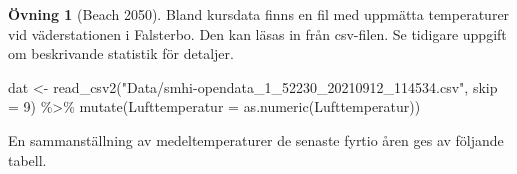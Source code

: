 \documentclass[
]{book}
\newenvironment{Shaded}{\begin{snugshade}}{\end{snugshade}}
\newcommand{\AttributeTok}[1]{\textcolor[rgb]{0.77,0.63,0.00}{#1}}
\newcommand{\DecValTok}[1]{\textcolor[rgb]{0.00,0.00,0.81}{#1}}
\newcommand{\FunctionTok}[1]{\textcolor[rgb]{0.00,0.00,0.00}{#1}}
\newcommand{\NormalTok}[1]{#1}
\newcommand{\OtherTok}[1]{\textcolor[rgb]{0.56,0.35,0.01}{#1}}
\newcommand{\SpecialCharTok}[1]{\textcolor[rgb]{0.00,0.00,0.00}{#1}}
\newcommand{\StringTok}[1]{\textcolor[rgb]{0.31,0.60,0.02}{#1}}
\theoremstyle{definition}
\theoremstyle{definition}
\theoremstyle{definition}
\newtheorem{exercise}{Övning}[chapter]
\theoremstyle{definition}
\theoremstyle{remark}
\begin{document}
\begin{exercise}[Beach 2050]
Bland kursdata finns en fil med uppmätta temperaturer vid väderstationen i Falsterbo. Den kan läsas in från csv-filen. Se tidigare uppgift om beskrivande statistik för detaljer.

\begin{Shaded}
\begin{Highlighting}[]
\NormalTok{dat }\OtherTok{\textless{}{-}} \FunctionTok{read\_csv2}\NormalTok{(}\StringTok{"Data/smhi{-}opendata\_1\_52230\_20210912\_114534.csv"}\NormalTok{, }\AttributeTok{skip =} \DecValTok{9}\NormalTok{) }\SpecialCharTok{\%\textgreater{}\%} 
  \FunctionTok{mutate}\NormalTok{(}\AttributeTok{Lufttemperatur =} \FunctionTok{as.numeric}\NormalTok{(Lufttemperatur))}
\end{Highlighting}
\end{Shaded}

En sammanställning av medeltemperaturer de senaste fyrtio åren ges av följande tabell.


\end{exercise}
\end{document}
